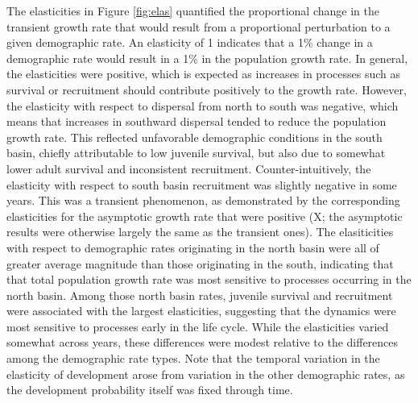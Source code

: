 \documentclass[11pt]{article}
\begin{document}
{The elasticities in Figure \ref{fig:elas} quantified the proportional change 
in the transient growth rate 
that would result from a proportional perturbation to a given demographic rate.
An elasticity of 1 indicates that a 1\% change in a demographic rate would result in
a 1\% in the population growth rate.
In general, the elasticities were positive,
which is expected as increases in processes such as survival or recruitment
should contribute positively to the growth rate.
However, the elasticity with respect to dispersal from north to south was negative,
which means that increases in southward dispersal 
tended to reduce the population growth rate.
This reflected unfavorable demographic conditions in the south basin,
chiefly attributable to low juvenile survival,
but also due to somewhat lower adult survival and inconsistent recruitment.
Counter-intuitively, the elasticity with respect to south basin recruitment was
slightly negative in some years. 
This was a transient phenomenon,
as demonstrated by the corresponding elasticities 
for the asymptotic growth rate that were positive
(X; the asymptotic results were otherwise largely the same as the transient ones).
The elasiticities with respect to 
demographic rates originating in the north basin were all of greater
average magnitude than those originating in the south,
indicating that that total population growth rate was most sensitive to processes
occurring in the north basin.
Among those north basin rates, juvenile survival and recruitment were associated with
the largest elasticities,
suggesting that the dynamics were most sensitive to processes early in the life cycle.
While the elasticities varied somewhat across years, 
these differences were modest relative to the differences among the demographic rate types.
Note that the temporal variation in the elasticity of development arose from
variation in the other demographic rates, 
as the development probability itself was fixed through time.

}
\end{document}
